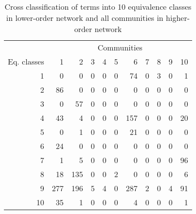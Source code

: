 \begin{table}[ht]
\centering
\begin{tabular}{rrrrrrrrrrr}
  \hline
  & \multicolumn{10}{c}{ Communities } \\
 Eq. classes & 1 & 2 & 3 & 4 & 5 & 6 & 7 & 8 & 9 & 10 \\
 \hline
1 &   0 &   0 &   0 &   0 &   0 &  74 &   0 &   3 &   0 &   1 \\ 
  2 &  86 &   0 &   0 &   0 &   0 &   0 &   0 &   0 &   0 &   0 \\ 
  3 &   0 &  57 &   0 &   0 &   0 &   0 &   0 &   0 &   0 &   0 \\ 
  4 &  43 &   4 &   0 &   0 &   0 & 157 &   0 &   0 &   0 &  20 \\ 
  5 &   0 &   1 &   0 &   0 &   0 &  21 &   0 &   0 &   0 &   0 \\ 
  6 &  24 &   0 &   0 &   0 &   0 &   0 &   0 &   0 &   0 &   0 \\ 
  7 &   1 &   5 &   0 &   0 &   0 &   0 &   0 &   0 &   0 &  96 \\ 
  8 &  18 & 135 &   0 &   0 &   2 &   0 &   0 &   0 &   0 &   6 \\ 
  9 & 277 & 196 &   5 &   4 &   0 & 287 &   2 &   0 &   4 &  91 \\ 
  10 &  35 &   1 &   0 &   0 &   0 &   4 &   0 &   0 &   0 &   1 \\ 
   \hline
\end{tabular}
\caption[Cross-tabulation of 10-block model and communities]{Cross classification of terms into 10 equivalence classes in lower-order network and all communities in higher-order network} 
\label{tab:c3_global_block1}
\end{table}
